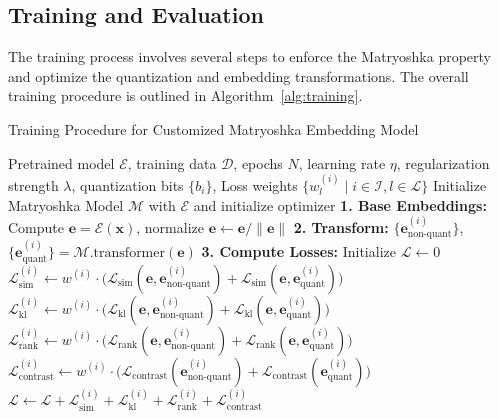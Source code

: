 \subsection{Training and Evaluation}


The training process involves several steps to enforce the Matryoshka property and optimize the quantization and embedding transformations. The overall training procedure is outlined in Algorithm~\ref{alg:training}.



\begin{algorithm}[H]
\small  %
\caption{Training Procedure for Customized Matryoshka Embedding Model}
\label{alg:training}
\begin{algorithmic}[1]
\Require Pretrained model $\mathcal{E}$, training data $\mathcal{D}$, epochs $N$, learning rate $\eta$, regularization strength $\lambda$, quantization bits $\{b_i\}$, Loss weights $\{w_{l}^{(i)} \mid i \in \mathcal{I}, l \in \mathcal{L}\}$
\State Initialize Matryoshka Model $\mathcal{M}$ with $\mathcal{E}$ and initialize optimizer
        \State \textbf{1. Base Embeddings:} Compute $\mathbf{e} = \mathcal{E}(\mathbf{x})$, normalize $\mathbf{e} \leftarrow \mathbf{e} / \|\mathbf{e}\|$
        \State \textbf{2. Transform:} $\{\mathbf{e}_{\text{non-quant}}^{(i)}\}$, $\{\mathbf{e}_{\text{quant}}^{(i)}\} = \mathcal{M}.\text{transformer}(\mathbf{e})$
        \State \textbf{3. Compute Losses:} Initialize $\mathcal{L} \leftarrow 0$
            \State $\mathcal{L}_{\text{sim}}^{(i)} \leftarrow w^{(i)} \cdot \big( \mathcal{L}_{\text{sim}}(\mathbf{e}, \mathbf{e}_{\text{non-quant}}^{(i)}) + \mathcal{L}_{\text{sim}}(\mathbf{e}, \mathbf{e}_{\text{quant}}^{(i)}) \big)$
            \State $\mathcal{L}_{\text{kl}}^{(i)} \leftarrow w^{(i)} \cdot \big( \mathcal{L}_{\text{kl}}(\mathbf{e}, \mathbf{e}_{\text{non-quant}}^{(i)}) + \mathcal{L}_{\text{kl}}(\mathbf{e}, \mathbf{e}_{\text{quant}}^{(i)}) \big)$
            \State $\mathcal{L}_{\text{rank}}^{(i)} \leftarrow w^{(i)} \cdot \big( \mathcal{L}_{\text{rank}}(\mathbf{e}, \mathbf{e}_{\text{non-quant}}^{(i)}) + \mathcal{L}_{\text{rank}}(\mathbf{e}, \mathbf{e}_{\text{quant}}^{(i)}) \big)$
            \State $\mathcal{L}_{\text{contrast}}^{(i)} \leftarrow w^{(i)} \cdot \big( \mathcal{L}_{\text{contrast}}(\mathbf{e}_{\text{non-quant}}^{(i)}) + \mathcal{L}_{\text{contrast}}(\mathbf{e}_{\text{quant}}^{(i)}) \big)$
            \State $\mathcal{L} \leftarrow \mathcal{L} + \mathcal{L}_{\text{sim}}^{(i)} + \mathcal{L}_{\text{kl}}^{(i)} + \mathcal{L}_{\text{rank}}^{(i)} + \mathcal{L}_{\text{contrast}}^{(i)}$
        \EndFor
        

\end{algorithmic}
\end{algorithm}
